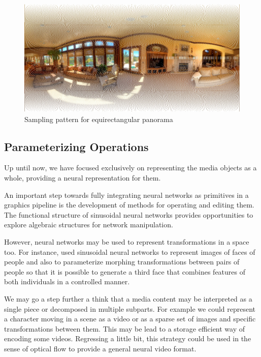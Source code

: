 \begin{figure}[!ht]
   \centering
   \includegraphics[width=0.80\linewidth]{img/ch7/sampling-pattern.jpeg}
   \caption{Sampling pattern for equirectangular panorama} 
   \label{f:inr-panorama}
\end{figure}


\subsection{Parameterizing Operations}

Up until now, we have focused exclusively on representing the media objects as a whole, providing a neural representation for them. 

An important step towards fully integrating neural networks as primitives in a graphics pipeline is the development of methods for operating and editing them. The functional structure of sinusoidal neural networks provides opportunities to explore algebraic structures for network manipulation. 


However, neural networks may be used to represent transformations in a space too. For instance, \cite{schardong2024neural} used sinusoidal neural networks to represent images of faces of people and also to parameterize morphing transformations between pairs of people so that it is possible to generate a third face that combines features of both individuals in a controlled manner.


We may go a step further a think that a media content may be interpreted as a single piece or decomposed in multiple subparts. For example we could represent a character moving in a scene as a video or as a sparse set of images and specific transformations between them. This may be lead to a storage efficient way of encoding some videos. Regressing a little bit, this strategy could be used in the sense of optical flow \citep{alfarano-opticalflow} to provide a general neural video format.


